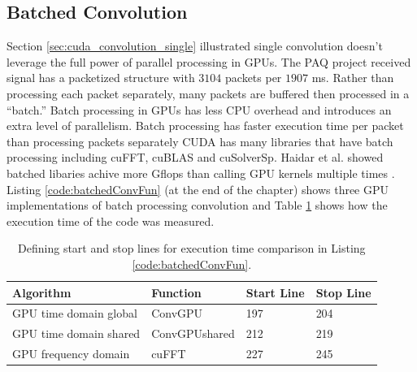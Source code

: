 \subsection{Batched Convolution}
\label{sec:batched_convolution}
Section \ref{sec:cuda_convolution_single} illustrated single convolution doesn't leverage the full power of parallel processing in GPUs.
The PAQ project received signal has a packetized structure with $3104$ packets per $1907$ ms.
Rather than processing each packet separately, many packets are buffered then processed in a ``batch.''
Batch processing in GPUs has less CPU overhead and introduces an extra level of parallelism.
Batch processing has faster execution time per packet than processing packets separately 
CUDA has many libraries that have batch processing including cuFFT, cuBLAS and cuSolverSp.
Haidar et al. showed batched libaries achive more Gflops than calling GPU kernels multiple times \cite{haidar2015optimization}.
Listing \ref{code:batchedConvFun} (at the end of the chapter) shows three GPU implementations of batch processing convolution and Table \ref{tab:BatchedGPUtimingTable} shows how the execution time of the code was measured.
\begin{table}
\caption{Defining start and stop lines for execution time comparison in Listing \ref{code:batchedConvFun}.}
\begin{center}
\begin{tabular}{llll}
	\toprule
	Algorithm 				& Function		& Start Line	& Stop  Line		\\ \midrule
	GPU time domain global 	& ConvGPU 		& 197			& 204				\\
	GPU time domain shared 	& ConvGPUshared & 212			& 219				\\
	GPU frequency domain 	& cuFFT			& 227			& 245				\\ 
	\bottomrule
\end{tabular}
\end{center}
\label{tab:BatchedGPUtimingTable}
\end{table}


